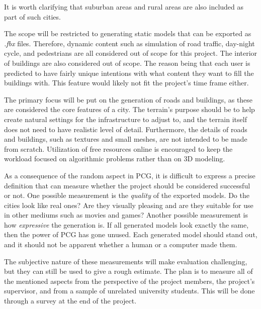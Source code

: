 It is worth clarifying that suburban areas and rural areas are also included as
part of such cities.

The scope will be restricted to generating static models that can be exported as \textit{.fbx} files.
Therefore, dynamic content such as simulation of road traffic, day-night cycle,
and pedestrians are all considered out of scope for this project.
The interior of buildings are also considered out of scope.
The reason being that each user is predicted to have fairly unique intentions with 
what content they want to fill the buildings with. This feature would likely not
fit the project's time frame either.

The primary focus will be put on the generation of roads and buildings, as these
are considered the core features of a city.
The terrain's purpose should be to help create natural
settings for the infrastructure to adjust to, and the terrain itself does not need
to have realistic level of detail. Furthermore, the details of roads and
buildings, such as textures and small meshes, are not intended to be made from
scratch. Utilization of free resources online is encouraged to keep the workload
focused on algorithmic problems rather than on 3D modeling.

As a consequence of the random aspect in PCG, it is difficult to express a precise definition that can measure whether the project should be considered successful or not.
One possible measurement is the \textit{quality} of the exported models.
Do the cities look like real ones?
Are they visually pleasing and are they suitable for use in other mediums such as movies and games?
Another possible measurement is how \textit{expressive} the generation is.
If all generated models look exactly the same, then the power of PCG has gone unused.
Each generated model should stand out, and it should not be apparent whether a
human or a computer made them.

The subjective nature of these measurements will make evaluation challenging,
but they can still be used to give a rough estimate.
The plan is to measure all of the mentioned aspects from the perspective of
the project members, the project's supervisor, and from a sample of unrelated
university students. This will be done through a survey at the end of the project.

